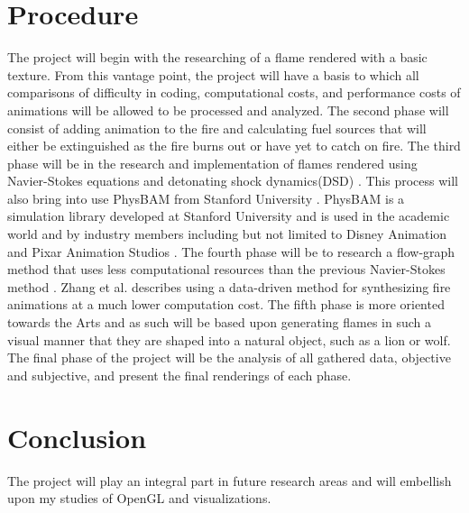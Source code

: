 \documentclass[11pt,twocolumn]{article}
\begin{document}
	\section{Procedure}
	The project will begin with the researching of a flame rendered with a basic texture. From this vantage point, the project will have a basis to which all comparisons of difficulty in coding, computational costs, and performance costs of animations will be allowed to be processed and analyzed. The second phase will consist of adding animation to the fire and calculating fuel sources that will either be extinguished as the fire burns out or have yet to catch on fire. The third phase will be in the research and implementation of flames rendered using Navier-Stokes equations and detonating shock dynamics(DSD) \cite{Hong:2007:WFC:1276377.1276436}. This process will also bring into use PhysBAM from Stanford University \cite{Dubey:2011:PPB:2037636.2037646}. PhysBAM is a simulation library developed at Stanford University and is used in the academic world and by industry members including but not limited to Disney Animation and Pixar Animation Studios \cite{Dubey:2011:PPB:2037636.2037646}. The fourth phase will be to research a flow-graph method that uses less computational resources than the previous Navier-Stokes method \cite{Zhang:2011:GFS:2019406.2019431}. Zhang et al. describes using a data-driven method for synthesizing fire animations at a much lower computation cost. \cite{Zhang:2011:GFS:2019406.2019431} The fifth phase is more oriented towards the Arts and as such will be based upon generating flames in such a visual manner that they are shaped into a natural object, such as a lion or wolf. \cite{Bangalore:2012:TAD:2328888.2328896} The final phase of the project will be the analysis of all gathered data, objective and subjective, and present the final renderings of each phase.
	
	\section{Conclusion}
	The project will play an integral part in future research areas and will embellish upon my studies of OpenGL and visualizations.
	
	\clearpage
	
\end{document}

